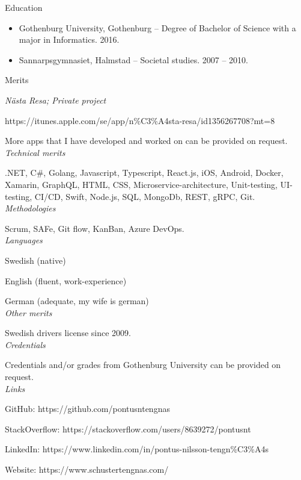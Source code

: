 \vspace{12px}

{\itshape\Large\begin{center}
Education
\end{center}}

\vspace{12px}

\begin{itemize}
  \item Gothenburg University, Gothenburg – Degree of Bachelor of Science with a major in Informatics. 2016.

  \item Sannarpsgymnasiet, Halmstad – Societal studies. 2007 – 2010.
\end{itemize}

\newpage

{\itshape\Large\begin{center}
Merits
\end{center}}

\vspace{12px}

{\itshape Nästa Resa; Private project}

https://itunes.apple.com/se/app/n\%C3\%A4sta-resa/id1356267708?mt=8

More apps that I have developed and worked on can be provided on request.\\

{\itshape Technical merits}

.NET, C\#, Golang, Javascript, Typescript, React.js, iOS, Android, Docker, Xamarin, GraphQL, HTML,
CSS, Microservice-architecture, Unit-testing, UI-testing, CI/CD, Swift, Node.js, SQL, MongoDb, REST, gRPC, Git.\\

{\itshape Methodologies}

Scrum, SAFe, Git flow, KanBan, Azure DevOps.\\

{\itshape Languages}

Swedish (native)

English (fluent, work-experience)

German (adequate, my wife is german)\\

{\itshape Other merits}

Swedish drivers license since 2009.\\

{\itshape Credentials}

Credentials and/or grades from Gothenburg University can be provided on request.\\

{\itshape Links}

GitHub: https://github.com/pontusntengnas

StackOverflow: https://stackoverflow.com/users/8639272/pontusnt

LinkedIn: https://www.linkedin.com/in/pontus-nilsson-tengn\%C3\%A4s

Website: https://www.schustertengnas.com/
